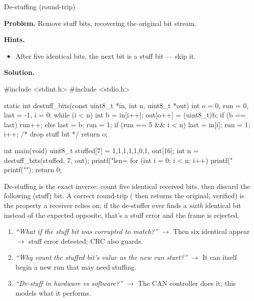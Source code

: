 \begin{gymproblem}{De-stuffing (round-trip)}

\textbf{Problem.} Remove stuff bits, recovering the original bit stream.

\textbf{Hints.}
\begin{itemize}
\item After five identical bits, the next bit is a stuff bit --- skip it.
\end{itemize}

\attempt

\textbf{Solution.}
\begin{cgym}
#include <stdint.h>
#include <stdio.h>

static int destuff_bits(const uint8_t *in, int n, uint8_t *out) {
    int o = 0, run = 0, last = -1, i = 0;
    while (i < n) {
        int b = in[i++];
        out[o++] = (uint8_t)b;
        if (b == last) run++; else { last = b; run = 1; }
        if (run == 5 && i < n) { last = in[i]; run = 1; i++; }   /* drop stuff bit */
    }
    return o;
}

int main(void) {
    uint8_t stuffed[7] = {1,1,1,1,1,0,1}, out[16];
    int n = destuff_bits(stuffed, 7, out);
    printf("len=%
    for (int i = 0; i < n; i++) printf("%
    printf("\n");
    return 0;
}
\end{cgym}

De-stuffing is the exact inverse: count five identical received bits, then
discard the following (stuff) bit. A correct round-trip ( then
 returns the original, verified) is the property a receiver relies
on; if the de-stuffer ever finds a \emph{sixth} identical bit instead of the
expected opposite, that's a stuff error and the frame is rejected.

\followups
\begin{enumerate}
\item \emph{``What if the stuff bit was corrupted to match?''} $\rightarrow$
  Then six identical appear $\rightarrow$ stuff error detected; CRC also guards.
\item \emph{``Why count the stuffed bit's value as the new run start?''}
  $\rightarrow$ It can itself begin a new run that may need stuffing.
\item \emph{``De-stuff in hardware vs software?''} $\rightarrow$ The CAN
  controller does it; this models what it performs.
\end{enumerate}
\end{gymproblem}

